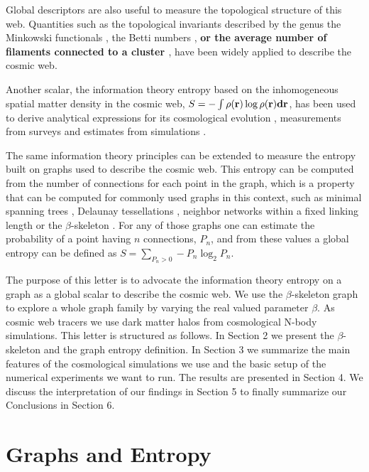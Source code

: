 \documentclass[fleqn,usenatbib]{mnras}
\begin{document}
Global descriptors are also useful to measure the topological structure of this web.
Quantities such as the topological invariants described by  the genus
\citep{1986ApJ...309....1H, 1986ApJ...306..341G} the Minkowski functionals 
\citep{1997ApJ...482L...1S}, the Betti numbers
\citep{2013JKAS...46..125P,2017MNRAS.465.4281P}, \textbf{or the average
number of filaments connected to a cluster \citep{2018MNRAS.479..973C}
}, have been widely applied to describe the cosmic web. 

Another scalar, the information theory entropy based on the inhomogeneous 
spatial matter density in the cosmic web,
$S=-\int\rho(\bf{r})\log\rho(\bf{r}) d\bf{r}$, has
been used to derive analytical expressions for its cosmological evolution
\citep{2004PhRvL..92n1302H}, measurements from surveys
\citep{2015MNRAS.454.2647P}
and estimates from simulations \citep{2020MNRAS.491.5447V}.

The same information theory principles can be extended to measure the entropy built 
on graphs  used to describe the cosmic web. 
This entropy can be computed from the number of connections for each
point in the graph,  which is a property that  can be computed for commonly used graphs in
this context, such as  minimal spanning trees
\citep{1985MNRAS.216...17B}, Delaunay tessellations 
\citep{2007MNRAS.382....2R}, neighbor networks within a fixed linking
length \citep{2016MNRAS.459.2690H} or the $\beta$-skeleton
\citep{2019MNRAS.485.5276F}.   
For any of those graphs one can estimate the probability of a point
having $n$ connections, $P_n$, and from these values a global entropy
can be defined as $S = \sum_{P_n>0}-P_n\log_2{P_n}$. 

The purpose of this letter is to advocate the information theory entropy on a graph
as a global scalar to describe the cosmic web.
We use the $\beta$-skeleton graph to explore a whole graph family 
by varying the real valued parameter $\beta$.
As cosmic web tracers we use dark matter halos from cosmological N-body simulations. 
This letter is structured as follows. 
In Section 2 we present the $\beta$-skeleton and the graph entropy definition.
In Section 3 we summarize the main features of the cosmological simulations we use and 
the basic setup of the numerical experiments we want to run.
The results are presented in Section 4.
We discuss the interpretation of our findings in Section
5 to finally summarize our Conclusions in Section 6.  

\section{Graphs and Entropy}
\end{document}
